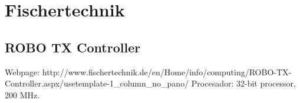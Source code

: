 
\section{Fischertechnik}

\subsection{ROBO TX Controller}
Webpage:
http://www.fischertechnik.de/en/Home/info/computing/ROBO-TX-Controller.aspx/usetemplate-1_column_no_pano/
Procesador:
32-bit processor, 200 MHz.

